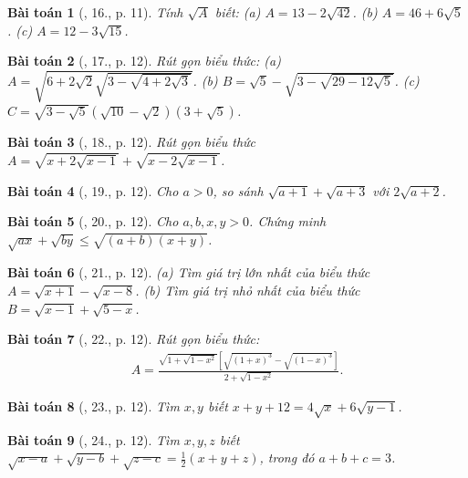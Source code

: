 \documentclass{article}
\newtheorem{baitoan}{Bài toán}
\begin{document}
\begin{baitoan}[\cite{Tuyen_Toan_9}, 16., p. 11]
	Tính $\sqrt{A}$ biết: (a) $A = 13 - 2\sqrt{42}$. (b) $A = 46 + 6\sqrt{5}$. (c) $A = 12 - 3\sqrt{15}$.
\end{baitoan}

\begin{baitoan}[\cite{Tuyen_Toan_9}, 17., p. 12]
	Rút gọn biểu thức: (a) $A = \sqrt{6 + 2\sqrt{2}\sqrt{3 - \sqrt{4 + 2\sqrt{3}}}}$. (b) $B = \sqrt{5} - \sqrt{3 - \sqrt{29 - 12\sqrt{5}}}$. (c) $C = \sqrt{3 - \sqrt{5}}(\sqrt{10} - \sqrt{2})(3 + \sqrt{5})$.
\end{baitoan}

\begin{baitoan}[\cite{Tuyen_Toan_9}, 18., p. 12]
	Rút gọn biểu thức $A = \sqrt{x + 2\sqrt{x - 1}} + \sqrt{x - 2\sqrt{x - 1}}$.
\end{baitoan}

\begin{baitoan}[\cite{Tuyen_Toan_9}, 19., p. 12]
	Cho $a > 0$, so sánh $\sqrt{a + 1} + \sqrt{a + 3}$ với $2\sqrt{a + 2}$.
\end{baitoan}

\begin{baitoan}[\cite{Tuyen_Toan_9}, 20., p. 12]
	Cho $a,b,x,y > 0$. Chứng minh $\sqrt{ax} + \sqrt{by}\le\sqrt{(a + b)(x + y)}$.
\end{baitoan}

\begin{baitoan}[\cite{Tuyen_Toan_9}, 21., p. 12]
	(a) Tìm giá trị lớn nhất của biểu thức $A = \sqrt{x + 1} - \sqrt{x - 8}$. (b) Tìm giá trị nhỏ nhất của biểu thức $B = \sqrt{x - 1} + \sqrt{5 - x}$.
\end{baitoan}

\begin{baitoan}[\cite{Tuyen_Toan_9}, 22., p. 12]
	Rút gọn biểu thức:
	\begin{align*}
		A = \frac{\sqrt{1 + \sqrt{1 - x^2}}\left[\sqrt{(1 + x)^3} - \sqrt{(1 - x)^3}\right]}{2 + \sqrt{1 - x^2}}.
	\end{align*}
\end{baitoan}

\begin{baitoan}[\cite{Tuyen_Toan_9}, 23., p. 12]
	Tìm $x,y$ biết $x + y + 12 = 4\sqrt{x} + 6\sqrt{y - 1}$.
\end{baitoan}

\begin{baitoan}[\cite{Tuyen_Toan_9}, 24., p. 12]
	Tìm $x,y,z$ biết $\sqrt{x - a} + \sqrt{y - b} + \sqrt{z - c} = \frac{1}{2}(x + y + z)$, trong đó $a + b + c = 3$.
\end{baitoan}
\end{document}
